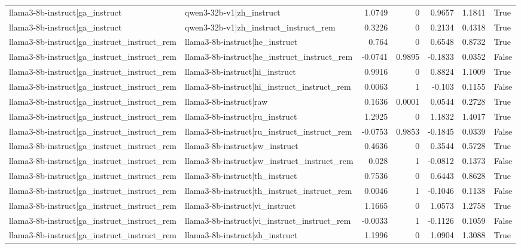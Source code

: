 \begin{table}
\begin{tabular}{l l r r r r l}
llama3-8b-instruct|ga_instruct & qwen3-32b-v1|zh_instruct & 1.0749 & 0 & 0.9657 & 1.1841 & True \\
llama3-8b-instruct|ga_instruct & qwen3-32b-v1|zh_instruct_instruct_rem & 0.3226 & 0 & 0.2134 & 0.4318 & True \\
llama3-8b-instruct|ga_instruct_instruct_rem & llama3-8b-instruct|he_instruct & 0.764 & 0 & 0.6548 & 0.8732 & True \\
llama3-8b-instruct|ga_instruct_instruct_rem & llama3-8b-instruct|he_instruct_instruct_rem & -0.0741 & 0.9895 & -0.1833 & 0.0352 & False \\
llama3-8b-instruct|ga_instruct_instruct_rem & llama3-8b-instruct|hi_instruct & 0.9916 & 0 & 0.8824 & 1.1009 & True \\
llama3-8b-instruct|ga_instruct_instruct_rem & llama3-8b-instruct|hi_instruct_instruct_rem & 0.0063 & 1 & -0.103 & 0.1155 & False \\
llama3-8b-instruct|ga_instruct_instruct_rem & llama3-8b-instruct|raw & 0.1636 & 0.0001 & 0.0544 & 0.2728 & True \\
llama3-8b-instruct|ga_instruct_instruct_rem & llama3-8b-instruct|ru_instruct & 1.2925 & 0 & 1.1832 & 1.4017 & True \\
llama3-8b-instruct|ga_instruct_instruct_rem & llama3-8b-instruct|ru_instruct_instruct_rem & -0.0753 & 0.9853 & -0.1845 & 0.0339 & False \\
llama3-8b-instruct|ga_instruct_instruct_rem & llama3-8b-instruct|sw_instruct & 0.4636 & 0 & 0.3544 & 0.5728 & True \\
llama3-8b-instruct|ga_instruct_instruct_rem & llama3-8b-instruct|sw_instruct_instruct_rem & 0.028 & 1 & -0.0812 & 0.1373 & False \\
llama3-8b-instruct|ga_instruct_instruct_rem & llama3-8b-instruct|th_instruct & 0.7536 & 0 & 0.6443 & 0.8628 & True \\
llama3-8b-instruct|ga_instruct_instruct_rem & llama3-8b-instruct|th_instruct_instruct_rem & 0.0046 & 1 & -0.1046 & 0.1138 & False \\
llama3-8b-instruct|ga_instruct_instruct_rem & llama3-8b-instruct|vi_instruct & 1.1665 & 0 & 1.0573 & 1.2758 & True \\
llama3-8b-instruct|ga_instruct_instruct_rem & llama3-8b-instruct|vi_instruct_instruct_rem & -0.0033 & 1 & -0.1126 & 0.1059 & False \\
llama3-8b-instruct|ga_instruct_instruct_rem & llama3-8b-instruct|zh_instruct & 1.1996 & 0 & 1.0904 & 1.3088 & True \\

\end{tabular}
\end{table}
